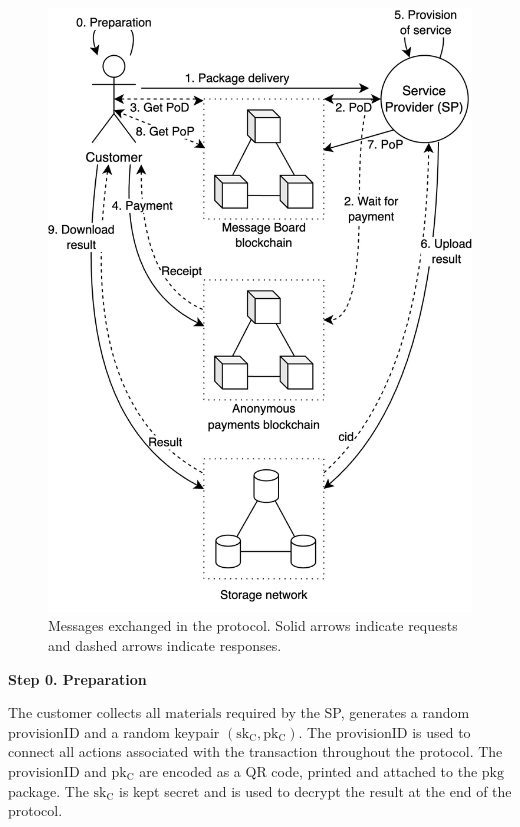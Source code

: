 \documentclass[pdftex,twocolumn,epjc3]{svjour3}
\begin{document}
{\begin{figure}[ht!]
\includegraphics[width=\linewidth]{anonser-protocol.png}
\centering
\caption{Messages exchanged in the protocol. Solid arrows indicate requests and dashed arrows indicate responses.}
\label{fig:protocol-diagram}
\end{figure}

\noindent \textbf
{Step 0.  Preparation}\label{step-0-preparation}

The customer collects all $\mathrm{materials}$ required by the SP, generates a random $\mathrm{provisionID}$ and a random keypair $(\mathrm{sk_C},\mathrm{pk_C})$. The $\mathrm{provisionID}$ is used to connect all actions associated with the transaction throughout the protocol. The $\mathrm{provisionID}$ and $\mathrm{pk_C}$ are encoded as a QR code, printed and attached to the $\mathrm{pkg}$ package. The $\mathrm{sk_C}$ is kept secret and is used to decrypt the $\mathrm{result}$ at the end of the protocol.

}
\end{document}
